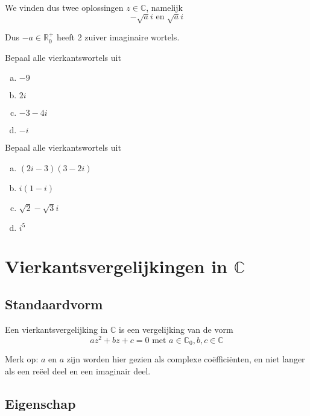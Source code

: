 \documentclass[12pt,twoside,a4paper]{article}
\begin{document}
We vinden dus twee oplossingen $z\in\mathbb{C}$, namelijk
$$-\sqrt{a}i \mbox{ en } \sqrt{a}i$$

Dus $-a\in\mathbb{R}^+_0$ heeft 2 zuiver imaginaire wortels.


\begin{oefening}
  Bepaal alle vierkantswortels uit
  \begin{multicols}{2}
  \begin{enumerate}[(a)]
    \itemsep 1em
  \item $-9$
  \item $2i$
  \item $-3-4i$
  \item $-i$
  \end{enumerate}
\end{multicols}
\end{oefening}

\begin{oefening}
  Bepaal alle vierkantswortels uit
  \begin{multicols}{2}
  \begin{enumerate}[(a)]
    \itemsep 1em
  \item $(2i-3)(3-2i)$
  \item $i(1-i)$
  \item $\sqrt{2}-\sqrt{3}i$
  \item $i^5$
  \end{enumerate}
\end{multicols}
\end{oefening}

\cleardoublepage
\section{Vierkantsvergelijkingen in $\mathbb{C}$}

\subsection{Standaardvorm}

\begin{mdframed}
  Een vierkantsvergelijking in $\mathbb{C}$ is een vergelijking van de vorm
  \[az^2+bz+c=0 \text{ met } a\in\mathbb{C}_0, b,c\in\mathbb{C}\]
\end{mdframed}

Merk op: $a$ en $a$ zijn worden hier gezien als complexe coëfficiënten, en niet langer als een reëel deel en een imaginair deel.

\subsection{Eigenschap}
\end{document}
